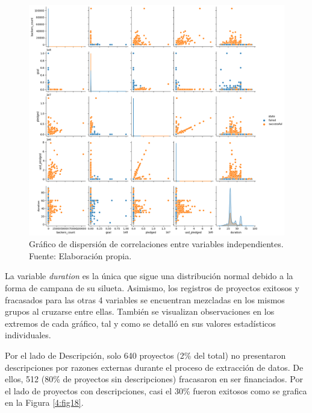 \begin{figure}[!ht]
	\begin{center}
		\includegraphics[width=1.00\textwidth]{4/figures/metadata cor-plot2.png}
		\caption[Gráfico de dispersión de correlaciones entre variables independientes]{Gráfico de dispersión de correlaciones entre variables independientes.\\
			Fuente: Elaboración propia.}
		\label{4:fig17}
	\end{center}
\end{figure}

La variable \textit{duration} es la única que sigue una distribución normal debido a la forma de campana de su silueta. Asimismo, los registros de proyectos exitosos y fracasados para las otras 4 variables se encuentran mezcladas en los mismos grupos al cruzarse entre ellas. También se visualizan observaciones en los extremos de cada gráfico, tal y como se detalló en sus valores estadísticos individuales.

\newpage
Por el lado de Descripción, solo 640 proyectos (2\% del total) no presentaron descripciones por razones externas durante el proceso de extracción de datos. De ellos, 512 (80\% de proyectos sin descripciones) fracasaron en ser financiados. Por el lado de proyectos con descripciones, casi el 30\% fueron exitosos como se grafica en la Figura \ref{4:fig18}.

